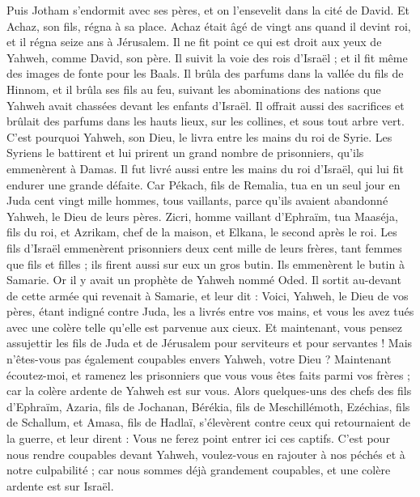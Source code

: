 \begin{multicols}{2}
Puis Jotham s'endormit avec ses pères, et on l'ensevelit dans la cité de David. Et Achaz, son fils, régna à sa place.
\VerseOne{}Achaz était âgé de vingt ans quand il devint roi, et il régna seize ans à Jérusalem. Il ne fit point ce qui est droit aux yeux de Yahweh, comme David, son père.
Il suivit la voie des rois d'Israël ; et il fit même des images de fonte pour les Baals.
Il brûla des parfums dans la vallée du fils de Hinnom, et il brûla ses fils au feu, suivant les abominations des nations que Yahweh avait chassées devant les enfants d'Israël.
Il offrait aussi des sacrifices et brûlait des parfums dans les hauts lieux, sur les collines, et sous tout arbre vert.
C'est pourquoi Yahweh, son Dieu, le livra entre les mains du roi de Syrie. Les Syriens le battirent et lui prirent un grand nombre de prisonniers, qu'ils emmenèrent à Damas. Il fut livré aussi entre les mains du roi d'Israël, qui lui fit endurer une grande défaite.
Car Pékach, fils de Remalia, tua en un seul jour en Juda cent vingt mille hommes, tous vaillants, parce qu'ils avaient abandonné Yahweh, le Dieu de leurs pères.
Zicri, homme vaillant d'Ephraïm, tua Maaséja, fils du roi, et Azrikam, chef de la maison, et Elkana, le second après le roi.
Les fils d'Israël emmenèrent prisonniers deux cent mille de leurs frères, tant femmes que fils et filles ; ils firent aussi sur eux un gros butin. Ils emmenèrent le butin à Samarie.
Or il y avait un prophète de Yahweh nommé Oded. Il sortit au-devant de cette armée qui revenait à Samarie, et leur dit : Voici, Yahweh, le Dieu de vos pères, étant indigné contre Juda, les a livrés entre vos mains, et vous les avez tués avec une colère telle qu'elle est parvenue aux cieux.
Et maintenant, vous pensez assujettir les fils de Juda et de Jérusalem pour serviteurs et pour servantes ! Mais n'êtes-vous pas également coupables envers Yahweh, votre Dieu ?
Maintenant écoutez-moi, et ramenez les prisonniers que vous vous êtes faits parmi vos frères ; car la colère ardente de Yahweh est sur vous.
Alors quelques-uns des chefs des fils d'Ephraïm, Azaria, fils de Jochanan, Bérékia, fils de Meschillémoth, Ezéchias, fils de Schallum, et Amasa, fils de Hadlaï, s'élevèrent contre ceux qui retournaient de la guerre,
et leur dirent : Vous ne ferez point entrer ici ces captifs. C'est pour nous rendre coupables devant Yahweh, voulez-vous en rajouter à nos péchés et à notre culpabilité ; car nous sommes déjà grandement coupables, et une colère ardente est sur Israël.

\end{multicols}
